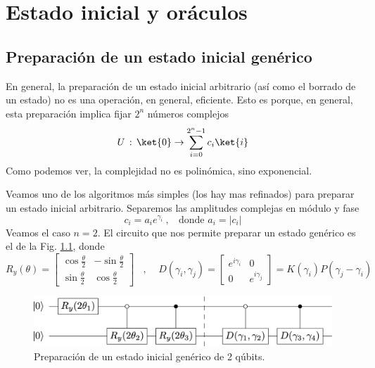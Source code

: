 \documentclass[a4paper,11pt]{book} %
\numberwithin{equation}{chapter}
\begin{document}
    


\chapter{Estado inicial y oráculos}


    \section{Preparación de un estado inicial genérico}

En general, la preparación de un estado inicial arbitrario (así como el borrado de un estado) no es una operación, en general, eficiente. Esto es porque, en general, esta preparación implica fijar $2^n$ números complejos
$$
U \, : \, \ket{0} \rightarrow \sum_{i=0}^{2^n-1} c_i \ket{i}
$$
Como podemos ver, la complejidad no es polinómica, sino exponencial. 

Veamos uno de los algoritmos más simples (los hay mas refinados) para preparar un estado inicial arbitrario. Separemos las amplitudes complejas en módulo y fase 
$$
c_i = a_i e^{\gamma_i} ~, ~~~~ \text{donde } a_i = |c_i|
$$
Veamos el caso $n=2$. El circuito que nos permite preparar un estado genérico es el de la Fig. \ref{Fig_InicialOracle_preparestatecircuit}, donde $$
R_y(\theta) = \begin{bmatrix} \cos\frac{\theta}{2} & -\sin\frac{\theta}{2} \\
 \sin\frac{\theta}{2}  & \cos\frac{\theta}{2} \end{bmatrix}~~~~, ~~~~~
D(\gamma_i,\gamma_j ) = \begin{bmatrix} e^{i\gamma_i} & 0 \\ 0 & e^{i\gamma_j} \end{bmatrix} = K(\gamma_i) P(\gamma_j-\gamma_i)
$$

	\begin{figure}[H]
	\centering 
	\includegraphics[width=0.65\linewidth]{Figuras/Fig_InicialOracle_preparestatecircuit}
	\caption{Preparación de un estado inicial genérico de 2 qúbits.}
	\label{Fig_InicialOracle_preparestatecircuit}
	\end{figure}
\end{document}
